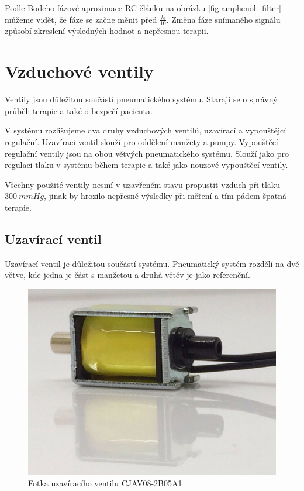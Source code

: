 Podle Bodeho fázové aproximace RC článku na obrázku \ref{fig:amphenol_filter} můžeme vidět, že fáze se začne měnit před $\frac{f_0}{10}$. 
Změna fáze snímaného signálu způsobí zkreslení výsledných hodnot a nepřesnou terapii.





\section{Vzduchové ventily}
Ventily jsou důležitou součástí pneumatického systému. Starají se o správný průběh terapie a také o bezpečí pacienta. \par
V systému rozlišujeme dva druhy vzduchových ventilů, uzavírací a vypouštějcí regulační. Uzavíraci ventil slouží pro oddělení manžety a pumpy. Vypouštěcí regulační ventily jsou na obou větvých pneumatického systému. Slouží jako pro regulaci tlaku v systému během terapie a také jako nouzové vypouštěcí ventily. \par
Všechny použité ventily nesmí v uzavřeném stavu propustit vzduch při tlaku $300 \ mmHg$, jinak by hrozilo nepřesné výsledky při měření a tím pádem špatná terapie.

\subsection{Uzavírací ventil}
Uzavírací ventil je důležitou součástí systému. Pneumatický systém rozdělí na dvě větve, kde jedna je část s manžetou a druhá větěv je jako referenční. \par

\begin{figure}[H]
\includegraphics[width=0.9\linewidth]{pictures/closing_valve.jpg}
\caption{Fotka uzavíracího ventilu CJAV08-2B05A1}
\label{fig:closing_valve}
\end{figure}

